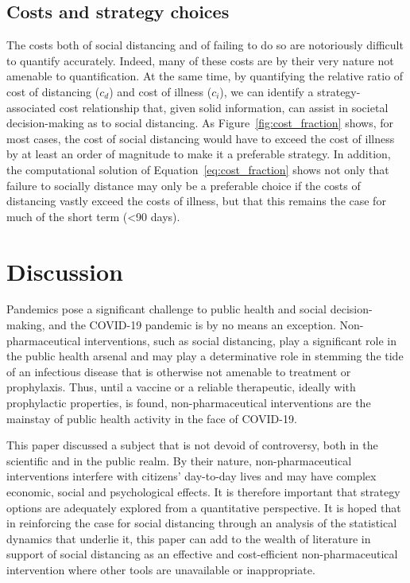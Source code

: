 \documentclass{article}
\begin{document}

\subsection{Costs and strategy choices} %
\label{sub:costs_and_strategy_choices}

The costs both of social distancing and of failing to do so are notoriously difficult to quantify accurately. Indeed, many of these costs are by their very nature not amenable to quantification. At the same time, by quantifying the relative ratio of cost of distancing ($c_d$) and cost of illness ($c_i$), we can identify a strategy-associated cost relationship that, given solid information, can assist in societal decision-making as to social distancing. As Figure~\ref{fig:cost_fraction} shows, for most cases, the cost of social distancing would have to exceed the cost of illness by at least an order of magnitude to make it a preferable strategy. In addition, the computational solution of Equation~\eqref{eq:cost_fraction} shows not only that failure to socially distance may only be a preferable choice if the costs of distancing vastly exceed the costs of illness, but that this remains the case for much of the short term (<90 days). 



\section{Discussion} %
\label{sec:discussion}

Pandemics pose a significant challenge to public health and social decision-making, and the COVID-19 pandemic is by no means an exception. Non-pharmaceutical interventions, such as social distancing, play a significant role in the public health arsenal and may play a determinative role in stemming the tide of an infectious disease that is otherwise not amenable to treatment or prophylaxis. Thus, until a vaccine or a reliable therapeutic, ideally with prophylactic properties, is found, non-pharmaceutical interventions are the mainstay of public health activity in the face of COVID-19.

This paper discussed a subject that is not devoid of controversy, both in the scientific and in the public realm. By their nature, non-pharmaceutical interventions interfere with citizens' day-to-day lives and may have complex economic, social and psychological effects. It is therefore important that strategy options are adequately explored from a quantitative perspective. It is hoped that in reinforcing the case for social distancing through an analysis of the statistical dynamics that underlie it, this paper can add to the wealth of literature in support of social distancing as an effective and cost-efficient non-pharmaceutical intervention where other tools are unavailable or inappropriate.
\end{document}
